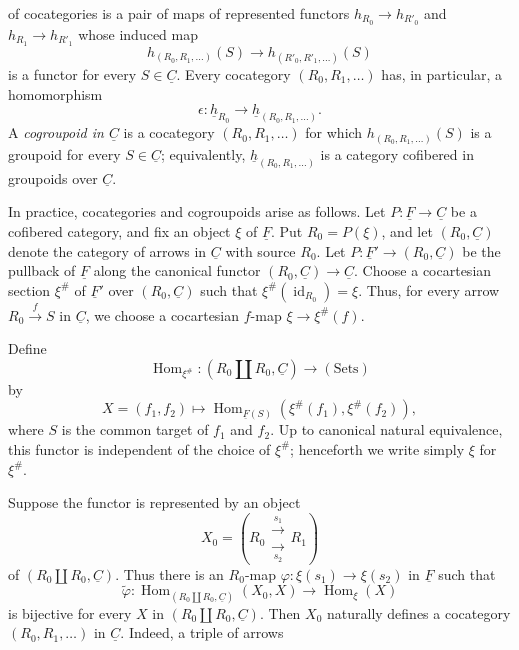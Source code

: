 of cocategories is a pair of maps of represented functors
$h_{R_0}\longrightarrow h_{R'_0}$ and
$h_{R_1}\longrightarrow h_{R'_1}$ whose induced map
\[
 h_{(R_0,R_1,\ldots)}(S)
 \longrightarrow h_{(R'_0,R'_1,\ldots)}(S)
\]
is a functor for every $S\in\underline C$. Every cocategory
$(R_0,R_1,\ldots)$ has, in particular, a homomorphism
\[
 \epsilon:\underline h_{R_0}
 \longrightarrow\underline h_{(R_0,R_1,\ldots)}.
\]
A \emph{cogroupoid in $\underline C$} is a cocategory
$(R_0,R_1,\ldots)$ for which $h_{(R_0,R_1,\ldots)}(S)$ is a groupoid
for every $S\in\underline C$; equivalently,
$\underline h_{(R_0,R_1,\ldots)}$ is a category cofibered in
groupoids over $\underline C$.

In practice, cocategories and cogroupoids arise as follows. Let
$P:\underline F\longrightarrow\underline C$ be a cofibered category,
and fix an object $\xi$ of $\underline F$. Put $R_0=P(\xi)$, and let
$(R_0,\underline C)$ denote the category of arrows in $\underline C$
with source $R_0$. Let
$P:\underline F'\longrightarrow(R_0,\underline C)$ be the pullback of
$\underline F$ along the canonical functor
$(R_0,\underline C)\longrightarrow\underline C$. Choose a
cocartesian section $\xi^{\#}$ of $\underline F'$ over
$(R_0,\underline C)$ such that
$\xi^{\#}(\operatorname{id}_{R_0})=\xi$. Thus, for every arrow
$R_0\xrightarrow fS$ in $\underline C$, we choose a cocartesian
$f$-map $\xi\longrightarrow\xi^{\#}(f)$.

Define
\[
 \operatorname{Hom}_{\xi^{\#}}:
 (R_0\amalg R_0,\underline C)\longrightarrow(\mathrm{Sets})
\]
by
\[
 X=(f_1,f_2)\longmapsto
 \operatorname{Hom}_{\underline F(S)}
   (\xi^{\#}(f_1),\xi^{\#}(f_2)),
\]
where $S$ is the common target of $f_1$ and $f_2$. Up to canonical
natural equivalence, this functor is independent of the choice of
$\xi^{\#}$; henceforth we write simply $\xi$ for $\xi^{\#}$.

Suppose the functor is represented by an object
\[
 X_0=
 \left(R_0\mathrel{\substack{\xrightarrow{\ s_1\ }\\[-.6ex]
                              \xrightarrow[\ s_2\ ]{}}}R_1\right)
\]
of $(R_0\amalg R_0,\underline C)$. Thus there is an $R_0$-map
$\varphi:\xi(s_1)\longrightarrow\xi(s_2)$ in $\underline F$ such
that
\[
 \widetilde\varphi:
 \operatorname{Hom}_{(R_0\amalg R_0,\underline C)}(X_0,X)
 \longrightarrow\operatorname{Hom}_\xi(X)
\]
is bijective for every $X$ in $(R_0\amalg R_0,\underline C)$. Then
$X_0$ naturally defines a cocategory $(R_0,R_1,\ldots)$ in
$\underline C$. Indeed, a triple of arrows

